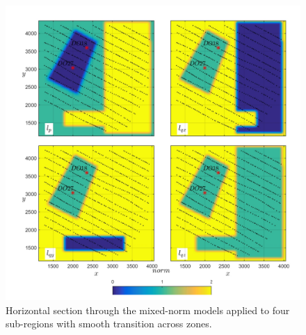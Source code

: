 \begin{figure}[p]
\centering
\includegraphics[scale=0.60]{TKC_Mix_Norm.pdf}
\caption{Horizontal section through the mixed-norm models applied to four sub-regions with smooth transition across zones.}
\label{fig:TKC_Mix_Norm}
\end{figure}

